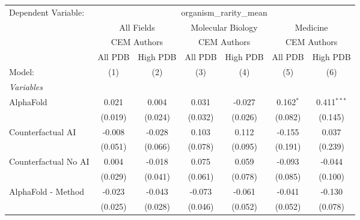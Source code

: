 \begingroup
\centering
\begin{tabular}{lcccccc}
   \tabularnewline \midrule \midrule
   Dependent Variable: & \multicolumn{6}{c}{organism\_rarity\_mean}\\
 & \multicolumn{2}{c}{All Fields} & \multicolumn{2}{c}{Molecular Biology} & \multicolumn{2}{c}{Medicine} \\
\cmidrule(lr){2-3} \cmidrule(lr){4-5} \cmidrule(lr){6-7}
 & \multicolumn{2}{c}{CEM Authors} & \multicolumn{2}{c}{CEM Authors} & \multicolumn{2}{c}{CEM Authors} \\
\cmidrule(lr){2-3} \cmidrule(lr){4-5} \cmidrule(lr){6-7}
 & \multicolumn{1}{c}{All PDB} & \multicolumn{1}{c}{High PDB} & \multicolumn{1}{c}{All PDB} & \multicolumn{1}{c}{High PDB} & \multicolumn{1}{c}{All PDB} & \multicolumn{1}{c}{High PDB} \\
\cmidrule(lr){2-2} \cmidrule(lr){3-3} \cmidrule(lr){4-4} \cmidrule(lr){5-5} \cmidrule(lr){6-6} \cmidrule(lr){7-7}
   Model:                                                     & (1)     & (2)     & (3)     & (4)          & (5)          & (6)\\  
   \midrule
   \emph{Variables}\\
   AlphaFold                                                  & 0.021   & 0.004   & 0.031   & -0.027       & 0.162$^{*}$  & 0.411$^{***}$\\   
                                                              & (0.019) & (0.024) & (0.032) & (0.026)      & (0.082)      & (0.145)\\   
   Counterfactual AI                                          & -0.008  & -0.028  & 0.103   & 0.112        & -0.155       & 0.037\\   
                                                              & (0.051) & (0.066) & (0.078) & (0.095)      & (0.191)      & (0.239)\\   
   Counterfactual No AI                                       & 0.004   & -0.018  & 0.075   & 0.059        & -0.093       & -0.044\\   
                                                              & (0.029) & (0.041) & (0.061) & (0.078)      & (0.085)      & (0.100)\\   
   AlphaFold - Method                                         & -0.023  & -0.043  & -0.073  & -0.061       & -0.041       & -0.130\\   
                                                              & (0.025) & (0.028) & (0.046) & (0.052)      & (0.052)      & (0.078)\\   

\end{tabular}
